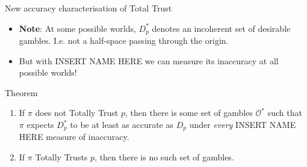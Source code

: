 \documentclass[aspectratio=169, dvipsnames]{beamer}
\newcommand{\Oset}{\mathcal{O}}
\begin{document}
\begin{frame}{New accuracy characterisation of Total Trust}
  \begin{itemize}
  \item \textbf{Note}: At some possible worlds, $D_p^*$ denotes an \alert{incoherent} set of desirable gambles. I.e.
    not a half-space passing through the origin.
  \item But with INSERT NAME HERE we can measure its inaccuracy at all possible worlds!
  \end{itemize}
  \begin{block}{Theorem}
    \begin{enumerate}
      \item If $\pi$ does not Totally Trust $p$, then there is some set of gambles $\Oset^*$ such that
        $\pi$ expects $D_p^*$ to be at least as accurate as $D_p$ under \textit{every} INSERT NAME HERE measure
        of inaccuracy.
      \item If $\pi$ Totally Trusts $p$, then there is no such set of gambles.
    \end{enumerate}
  \end{block}
\end{frame}
\end{document}
